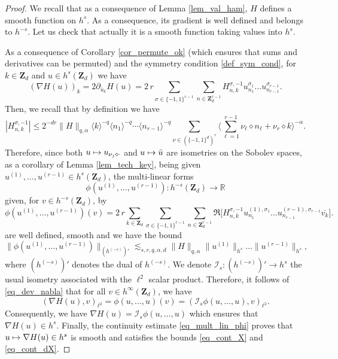 \documentclass[11pt]{article}
\newcommand\mto{\mathchoice{\longmapsto}{\mapsto}{\mapsto}{\mapsto}}
\theoremstyle{definition}
\begin{document}
\begin{proof} We recall that as a consequence of Lemma \ref{lem_val_ham}, $H$ defines a smooth function on $h^{s}$. As a consequence, its gradient is well defined and belongs to $h^{-s}$. Let us check that actually it is a smooth function taking values into $h^s$.

As a consequence of Corollary \ref{cor_permute_ok} (which ensures that sums and derivatives can be permuted) and the symmetry condition \eqref{def_sym_cond}, for $k\in \mathbf{Z}_d$ and $u \in h^s(\mathbf{Z}_d)$ we have
\begin{equation}
\label{eq_dev_nabla}
(\nabla H(u))_k = 2\partial_{\bar{u}_k} H(u) = 2\,r \sum_{\sigma \in \{-1,1\}^{r-1}} \sum_{n\in \mathbf{Z}_d^{r-1} } H_{n,k}^{\sigma,-1} u_{n_1}^{\sigma_1} \dots u_{n_{r-1}}^{\sigma_{r-1}}.
\end{equation}
Then, we recall that by definition we have
\[
|H_{n,k}^{\sigma,-1}| \leq 2^{-dr} \| H\|_{q,\alpha} \langle k \rangle^{-q} \langle n_1 \rangle^{-q} \cdots \langle n_{r-1} \rangle^{-q} \sum_{\nu \in (\{-1,1\}^d)^r} \biggl\langle \sum_{\ell =1}^{r-1} \nu_{\ell} \diamond n_{\ell} + \nu_{r} \diamond k \biggr\rangle^{-\alpha}.
\]
Therefore, since both $u\mto u_{\nu_j \diamond \cdot}$ and $u\mto \bar u$ are isometries on the Sobolev spaces, as a corollary of Lemma \ref{lem_tech_key}, being given $u^{(1)},\dots,u^{(r-1)}\in h^s(\mathbf{Z}_d)$, the multi-linear forms
\[
\phi(u^{(1)},\dots,u^{(r-1)}): h^{-s}(\mathbf{Z}_d) \to \mathbb{R}
\]
given, for $v\in h^{-s}(\mathbf{Z}_d)$, by
\[
\phi(u^{(1)},\dots,u^{(r-1)}) (v) = 2\,r \displaystyle \sum_{k\in \mathbf{Z}_d} \sum_{\sigma \in \{-1,1\}^{r-1}} \sum_{n\in \mathbf{Z}_d^{r-1} } \Re \bigl[H_{n,k}^{\sigma,-1} u_{n_1}^{(1),\sigma_1} \dots u_{n_{r-1}}^{(r-1),\sigma_{r-1}} \overline{v_k} \bigr].
\]
are well defined, smooth and we have the bound
\begin{equation}
\label{eq_mult_lin_phi}
\|\phi(u^{(1)},\dots,u^{(r-1)})\|_{(h^{(-s)})'} \lesssim_{s,r,q,\alpha,d} \| H\|_{q,\alpha} \| u^{(1)} \|_{h^s} \dots \| u^{(r-1)} \|_{h^s},
\end{equation}
where $(h^{(-s)})'$ denotes the dual of $h^{(-s)}$. We denote $\mathcal{I}_s:(h^{(-s)})'\to h^s $ the usual isometry associated with the $\ell^2$ scalar product.
Therefore, it follows of \eqref{eq_dev_nabla} that for all $v\in h^\infty(\mathbf{Z}_d)$, we have
\[
(\nabla H(u),v)_{\ell^2} = \phi(u,\dots,u)(v) = (\mathcal{I}_s \phi(u,\dots,u),v)_{\ell^2}.
\]
Consequently, we have $\nabla H(u)=\mathcal{I}_s \phi(u,\dots,u)$ which ensures that $\nabla H(u) \in h^s$. \hbox{Finally}, the continuity estimate \eqref{eq_mult_lin_phi} proves that $u\mto \nabla H(u)\in h^s$ is smooth and satisfies the bounds \eqref{eq_cont_X} and \eqref{eq_cont_dX}.
\end{proof}
\end{document}
